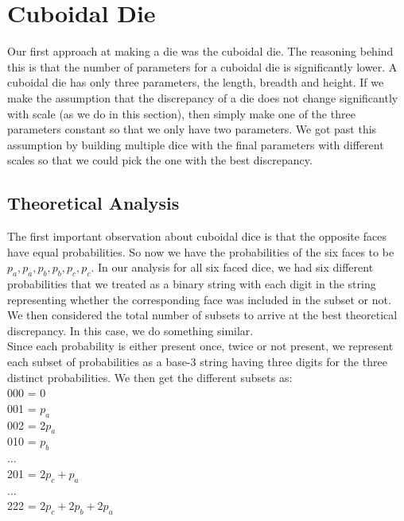 \section{Cuboidal Die}
Our first approach at making a die was the cuboidal die. The reasoning behind this is that the number of parameters for a cuboidal die is significantly lower. A cuboidal die has only three parameters, the length, breadth and height. If we make the assumption that the discrepancy of a die does not change significantly with scale (as we do in this section), then simply make one of the three parameters constant so that we only have two parameters. We got past this assumption by building multiple dice with the final parameters with different scales so that we could pick the one with the best discrepancy.\\

\subsection{Theoretical Analysis}
The first important observation about cuboidal dice is that the opposite faces have equal probabilities. So now we have the probabilities of the six faces to be $p_a, p_a, p_b, p_b, p_c, p_c$. In our analysis for all six faced dice, we had six different probabilities that we treated as a binary string with each digit in the string representing whether the corresponding face was included in the subset or not. We then considered the total number of subsets to arrive at the best theoretical discrepancy. In this case, we do something similar.\\

Since each probability is either present once, twice or not present, we represent each subset of probabilities as a base-3 string having three digits for the three distinct probabilities. We then get the different subsets as:\\
000 = 0\\
001 = $p_a$\\
002 = $2p_a$\\
010 = $p_b$\\
$\ldots$\\
201 = $2p_c + p_a$\\
$\ldots$\\
222 = $2p_c + 2p_b + 2p_a$\\

